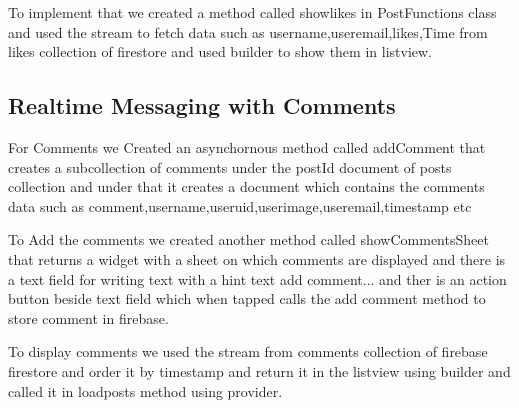 To implement that we created a method called showlikes in PostFunctions class and used the stream to fetch data such as username,useremail,likes,Time from likes collection of firestore and used builder to show them in listview.

\subsection{Realtime Messaging with Comments}

For Comments we Created an asynchornous method called addComment that creates a subcollection of comments under the postId document of posts collection and under that it creates a document which contains the comments data such as comment,username,useruid,userimage,useremail,timestamp etc

To Add the comments we created another method called showCommentsSheet that returns a widget with a sheet on which comments are displayed and there is a text field for writing text with a hint text add comment... and ther is an action button beside text field which when tapped calls the add comment method to store comment in firebase.

To display comments we used the stream from comments collection of firebase firestore and order it by timestamp and return it in the listview using builder and called it in loadposts method using provider.


